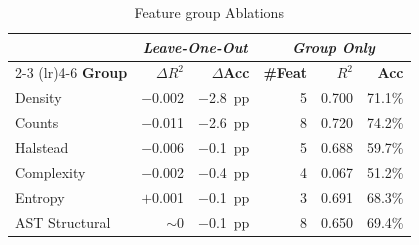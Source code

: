 \begin{table}[t]
\centering
\caption{Feature group Ablations}
\label{tab:ablation}
\small
\begin{tabular}{lrr rrr}
\toprule
& \multicolumn{2}{c}{\textit{Leave-One-Out}} 
& \multicolumn{3}{c}{\textit{Group Only}} \\
\cmidrule(lr){2-3} \cmidrule(lr){4-6}
\textbf{Group} & $\Delta R^2$ & $\Delta$\textbf{Acc} 
               & \textbf{\#Feat} & $R^2$ & \textbf{Acc} \\
\midrule
Density        & $-$0.002 & $-$2.8~pp & 5 & 0.700 & 71.1\% \\
Counts         & $-$0.011 & $-$2.6~pp & 8 & 0.720 & 74.2\% \\
Halstead       & $-$0.006 & $-$0.1~pp & 5 & 0.688 & 59.7\% \\
Complexity     & $-$0.002 & $-$0.4~pp & 4 & 0.067 & 51.2\% \\
Entropy        & $+$0.001 & $-$0.1~pp & 3 & 0.691 & 68.3\% \\
AST Structural & $\sim$0  & $-$0.1~pp & 8 & 0.650 & 69.4\% \\
\bottomrule
\end{tabular}
\end{table}
